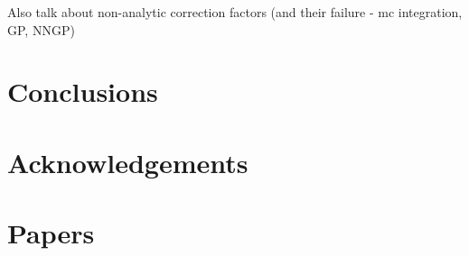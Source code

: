 \documentclass[a4paper,fleqn,usenatbib]{mnras}
\begin{document}
Also talk about non-analytic correction factors (and their failure - mc integration, GP, NNGP)



\section{Conclusions}



\section*{Acknowledgements}














\appendix

\section{Papers}






\bsp	%
\label{lastpage}
\end{document}
